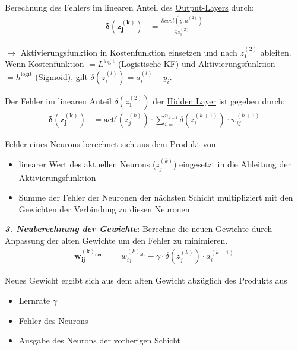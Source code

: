 Berechnung des Fehlers im linearen Anteil des \underline{Output-Layers} durch:
\begin{equation*}
    \begin{aligned}
        \boldsymbol{\delta(z_j^{(k)})}  &= \frac{\partial cost(y, a_1^{(2)})}{\partial z_1^{(2)}}
    \end{aligned}
\end{equation*}

$\rightarrow$ Aktivierungsfunktion in Kostenfunktion einsetzen und nach $z_1^{(2)}$ ableiten.\\

Wenn Kostenfunktion $=L^\text{logit}$ (Logistische KF) \underline{und} Aktivierungsfunktion $=h^\text{logit}$ (Sigmoid), gilt $\delta(z_i^{(l)})=a_i^{(l)}-y_i$.

Der Fehler im linearen Anteil $\delta(z_1^{(2)})$ der \underline{Hidden Layer} ist gegeben durch:
\begin{equation*}
    \begin{aligned}
        \boldsymbol{\delta(z_j^{(k)})}  &= \text{act}'(z_j^{(k)})\cdot\sum_{i=1}^{n_{k+1}}\delta(z_i^{(k+1)})\cdot w_{ij}^{(k+1)}
    \end{aligned}
\end{equation*}

Fehler eines Neurons berechnet sich aus dem Produkt von
\begin{itemize}
    \item linearer Wert des aktuellen Neurons ($z_j^{(k)}$) eingesetzt in die Ableitung der Aktivierungsfunktion
    \item Summe der Fehler der Neuronen der nächsten Schicht multipliziert mit den Gewichten der Verbindung zu diesen Neuronen\\
\end{itemize}

\emph{\textbf{3. Neuberechnung der Gewichte}}: Berechne die neuen Gewichte durch Anpassung der alten Gewichte um den Fehler zu minimieren.
\begin{equation*}
    \begin{aligned}
        \boldsymbol{w_{ij}^{(k)_\text{neu}}}  &= w_{ij}^{(k)_\text{alt}}-\gamma\cdot\delta(z_j^{(k)})\cdot a_i^{(k-1)}
    \end{aligned}
\end{equation*}

Neues Gewicht ergibt sich aus dem alten Gewicht abzüglich des Produkts aus
\begin{itemize}
    \item Lernrate $\gamma$
    \item Fehler des Neurons
    \item Ausgabe des Neurons der vorherigen Schicht\\
\end{itemize}

